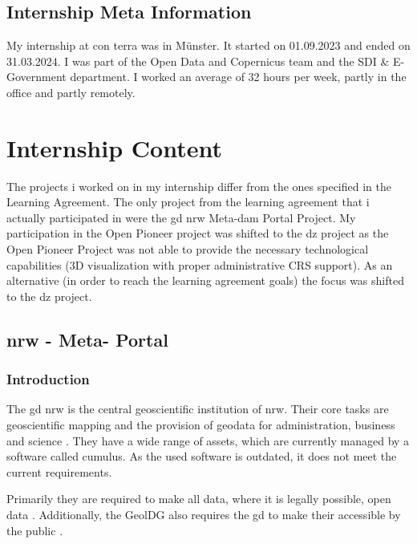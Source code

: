 \documentclass[11pt, titlepage, a4paper]{article}
\begin{document}
\subsection{Internship Meta Information}

My internship at con terra was in Münster. It started on 01.09.2023 and ended on 31.03.2024. I was part of the Open Data and Copernicus team and the SDI \& E-Government department. I worked an average of 32 hours per week, partly in the office and partly remotely.

\section{Internship Content}
The projects i worked on in my internship differ from the ones specified in the Learning Agreement. The only project from the learning agreement that i actually participated in were the \gls{gd} \gls{nrw} Meta-\gls{dam} Portal Project. My participation in the Open Pioneer \cite{conterraOpenPioneerTrails2024} project was shifted to the \gls{dz} project as the Open Pioneer Project was not able to provide the necessary technological capabilities (3D visualization with proper administrative CRS support). As an alternative (in order to reach the learning agreement goals) the focus was shifted to the \gls{dz} project.

\subsection{ \gls{nrw} -  Meta- Portal }
\subsubsection{Introduction}
The  \gls {gd} \gls {nrw}  is the central geoscientific institution of \gls {nrw}. Their  core tasks are geoscientific mapping and the provision of geodata for administration, business and science \cite{GeoDatenFurNordrheinWestfalen2024}.
They have a wide range of assets, which are currently managed by a software called cumulus. As the used software is outdated, it does not meet the current requirements.

Primarily they  are required to make all data, where it is legally possible, open data \cite{GesetzZurForderung2017}.
Additionally, the GeolDG also requires the \gls{gd} to make their accessible by the public \cite{GesetzZurStaatlichen2020}.
\end{document}
